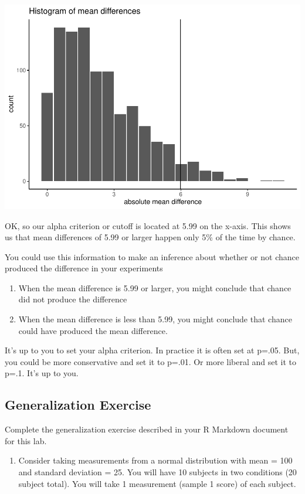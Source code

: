\documentclass[]{book}
\providecommand{\tightlist}{%
  \setlength{\itemsep}{0pt}\setlength{\parskip}{0pt}}
\begin{document}
\includegraphics{Statistics_Lab_files/figure-latex/unnamed-chunk-150-1.pdf}

OK, so our alpha criterion or cutoff is located at 5.99 on the x-axis.
This shows us that mean differences of 5.99 or larger happen only 5\% of
the time by chance.

You could use this information to make an inference about whether or not
chance produced the difference in your experiments

\begin{enumerate}
\def\labelenumi{\arabic{enumi}.}
\item
  When the mean difference is 5.99 or larger, you might conclude that
  chance did not produce the difference
\item
  When the mean difference is less than 5.99, you might conclude that
  chance could have produced the mean difference.
\end{enumerate}

It's up to you to set your alpha criterion. In practice it is often set
at p=.05. But, you could be more conservative and set it to p=.01. Or
more liberal and set it to p=.1. It's up to you.

\subsection{Generalization Exercise}\label{generalization-exercise-4}

Complete the generalization exercise described in your R Markdown
document for this lab.

\begin{enumerate}
\def\labelenumi{\arabic{enumi}.}
\tightlist
\item
  Consider taking measurements from a normal distribution with mean =
  100 and standard deviation = 25. You will have 10 subjects in two
  conditions (20 subject total). You will take 1 measurement (sample 1
  score) of each subject.
\end{enumerate}
\end{document}
